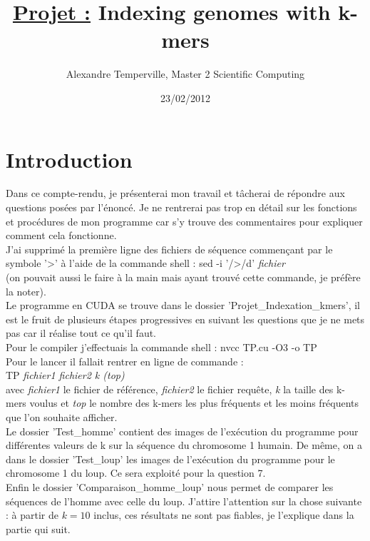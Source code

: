 \documentclass[10pt]{article}
\title{\textbf{\underline{Projet :} Indexing genomes with k-mers}}
\author{Alexandre Temperville, Master 2 Scientific Computing}
\date{23/02/2012}
\begin{document}
\maketitle




\section*{Introduction}


Dans ce compte-rendu, je présenterai mon travail et tâcherai de répondre aux questions posées par l'énoncé. Je ne rentrerai pas trop en détail sur les fonctions et procédures de mon programme car s'y trouve des commentaires pour expliquer comment cela fonctionne. \\

J'ai supprimé la première ligne des fichiers de séquence commençant par le symbole '>' à l'aide de la commande shell : 
sed -i '/>/d' \textit{fichier} \\
(on pouvait aussi le faire à la main mais ayant trouvé cette commande, je préfère la noter). \\


Le programme en CUDA se trouve dans le dossier 'Projet\_Indexation\_kmers', il est le fruit de plusieurs étapes progressives en suivant les questions que je ne mets pas car il réalise tout ce qu'il faut. \\
Pour le compiler j'effectuais la commande shell : 
nvcc TP.cu -O3 -o TP \\
Pour le lancer il fallait rentrer en ligne de commande : \\
TP \textit{fichier1 fichier2 k (top)} \\
avec \textit{fichier1} le fichier de référence, \textit{fichier2} le fichier requête, \textit{k} la taille des k-mers voulus et \textit{top} le nombre des k-mers les plus fréquents et les moins fréquents que l'on souhaite afficher. \\

Le dossier 'Test\_homme' contient des images de l'exécution du programme pour différentes valeurs de k sur la séquence du chromosome 1 humain. De même, on a dans le dossier 'Test\_loup' les images de l'exécution du programme pour le chromosome 1 du loup. Ce sera exploité pour la question 7. \\

Enfin le dossier 'Comparaison\_homme\_loup' nous permet de comparer les séquences de l'homme avec celle du loup. J'attire l'attention sur la chose suivante : à partir de $k = 10$ inclus, ces résultats ne sont pas fiables, je l'explique dans la partie qui suit. \\
\end{document}
